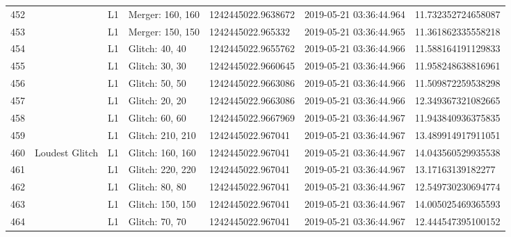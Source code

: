 \begin{longtable}{lllllll}
452  &                                                    &       L1 &  Merger: 160, 160 &  1242445022.9638672 &  2019-05-21 03:36:44.964 &  11.732352724658087 \\
453  &                                                    &       L1 &  Merger: 150, 150 &   1242445022.965332 &  2019-05-21 03:36:44.965 &  11.361862335558218 \\
454  &                                                    &       L1 &    Glitch: 40, 40 &  1242445022.9655762 &  2019-05-21 03:36:44.966 &  11.588164191129833 \\
455  &                                                    &       L1 &    Glitch: 30, 30 &  1242445022.9660645 &  2019-05-21 03:36:44.966 &  11.958248638816961 \\
456  &                                                    &       L1 &    Glitch: 50, 50 &  1242445022.9663086 &  2019-05-21 03:36:44.966 &  11.509872259538298 \\
457  &                                                    &       L1 &    Glitch: 20, 20 &  1242445022.9663086 &  2019-05-21 03:36:44.966 &  12.349367321082665 \\
458  &                                                    &       L1 &    Glitch: 60, 60 &  1242445022.9667969 &  2019-05-21 03:36:44.967 &  11.943840936375835 \\
459  &                                                    &       L1 &  Glitch: 210, 210 &   1242445022.967041 &  2019-05-21 03:36:44.967 &  13.489914917911051 \\
460  &                                     Loudest Glitch &       L1 &  Glitch: 160, 160 &   1242445022.967041 &  2019-05-21 03:36:44.967 &  14.043560529935538 \\
461  &                                                    &       L1 &  Glitch: 220, 220 &   1242445022.967041 &  2019-05-21 03:36:44.967 &   13.17163139182277 \\
462  &                                                    &       L1 &    Glitch: 80, 80 &   1242445022.967041 &  2019-05-21 03:36:44.967 &  12.549730230694774 \\
463  &                                                    &       L1 &  Glitch: 150, 150 &   1242445022.967041 &  2019-05-21 03:36:44.967 &  14.005025469365593 \\
464  &                                                    &       L1 &    Glitch: 70, 70 &   1242445022.967041 &  2019-05-21 03:36:44.967 &  12.444547395100152 \\

\end{longtable}
